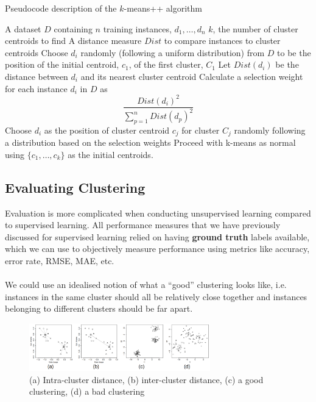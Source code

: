 \documentclass[a4paper,11pt]{article}
\begin{document}
\begin{algorithm}[H]
\caption{Pseudocode description of the $k$-means++ algorithm}
\begin{algorithmic}[1]
\Require A dataset $D$ containing $n$ training instances, $d_1, \dots, d_n$
\Require $k$, the number of cluster centroids to find
\Require A distance measure $Dist$ to compare instances to cluster centroids
\State Choose $d_i$ randomly (following a uniform distribution) from $D$ to be the position of the initial centroid, $c_1$, of the first cluster, $C_1$
        \State Let $Dist(d_i)$ be the distance between $d_i$ and its nearest cluster centroid
    \EndFor
    \State Calculate a selection weight for each instance $d_i$ in $D$ as
    \[
    \frac{Dist(d_i)^2}{\sum_{p=1}^{n} Dist(d_p)^2}
    \]
    \State Choose $d_i$ as the position of cluster centroid $c_j$ for cluster $C_j$ randomly following a distribution based on the selection weights
\EndFor
\State Proceed with k-means as normal using $\{c_1, \dots, c_k\}$ as the initial centroids.
\end{algorithmic}
\end{algorithm}

\subsection{Evaluating Clustering}
Evaluation is more complicated when conducting unsupervised learning compared to supervised learning.
All performance measures that we have previously discussed for supervised learning relied on having \textbf{ground truth} labels available, which we can use to objectively measure performance using metrics like accuracy, error rate, RMSE, MAE, etc.
\\\\
We could use an idealised notion of what a ``good'' clustering looks like, i.e. instances in the same cluster should all be relatively close together and instances belonging to different clusters should be far apart.
\begin{figure}[H]
    \centering
    \includegraphics[width=0.7\textwidth]{images/goodvbadclusterings.png}
    \caption{ (a) Intra-cluster distance, (b) inter-cluster distance, (c) a good clustering, (d) a bad clustering }
\end{figure}
\end{document}
